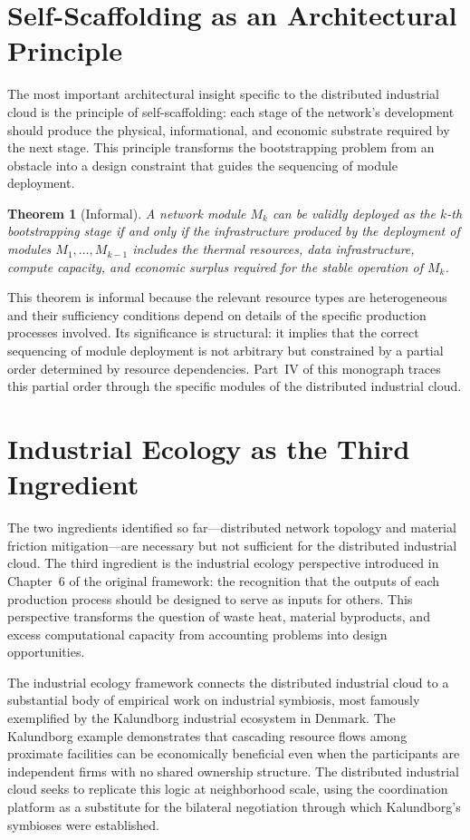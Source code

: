 \documentclass[12pt]{book}
\newtheorem{theorem}{Theorem}[chapter]
\theoremstyle{definition}
\theoremstyle{remark}
\begin{document}
\section{Self-Scaffolding as an Architectural Principle}

The most important architectural insight specific to the distributed
industrial cloud is the principle of self-scaffolding: each stage of
the network's development should produce the physical, informational,
and economic substrate required by the next stage. This principle
transforms the bootstrapping problem from an obstacle into a design
constraint that guides the sequencing of module deployment.

\begin{theorem}[Informal]
A network module $M_k$ can be validly deployed as the
$k$-th bootstrapping stage if and only if the infrastructure
produced by the deployment of modules $M_1, \ldots, M_{k-1}$
includes the thermal resources, data infrastructure, compute
capacity, and economic surplus required for the stable operation
of $M_k$.
\end{theorem}

This theorem is informal because the relevant resource types are
heterogeneous and their sufficiency conditions depend on details
of the specific production processes involved. Its significance is
structural: it implies that the correct sequencing of module
deployment is not arbitrary but constrained by a partial order
determined by resource dependencies. Part~IV of this monograph
traces this partial order through the specific modules of the
distributed industrial cloud.

\section{Industrial Ecology as the Third Ingredient}

The two ingredients identified so far---distributed network topology
and material friction mitigation---are necessary but not sufficient
for the distributed industrial cloud. The third ingredient is the
industrial ecology perspective introduced in Chapter~6 of the
original framework: the recognition that the outputs of each
production process should be designed to serve as inputs for others.
This perspective transforms the question of waste heat, material
byproducts, and excess computational capacity from accounting
problems into design opportunities.

The industrial ecology framework connects the distributed industrial
cloud to a substantial body of empirical work on industrial symbiosis,
most famously exemplified by the Kalundborg industrial ecosystem in
Denmark. The Kalundborg example demonstrates that cascading resource
flows among proximate facilities can be economically beneficial even
when the participants are independent firms with no shared ownership
structure. The distributed industrial cloud seeks to replicate this
logic at neighborhood scale, using the coordination platform as a
substitute for the bilateral negotiation through which Kalundborg's
symbioses were established.
\end{document}
